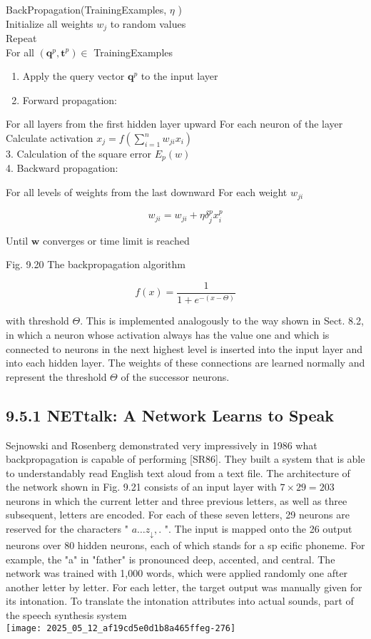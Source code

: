 \documentclass[10pt]{article}
\begin{document}
BackPropagation(TrainingExamples, $\eta$ )\\
Initialize all weights $w_{j}$ to random values\\
Repeat\\
For 
all $\left(\boldsymbol{q}^{p}, \boldsymbol{t}^{p}\right) \in$ TrainingExamples

\begin{enumerate}
  \item Apply the query vector $\boldsymbol{q}^{p}$ to the input layer
  \item Forward propagation:
\end{enumerate}

For all layers from the first hidden layer upward For each neuron of the layer Calculate activation $x_{j}=f\left(\sum_{i=1}^{n} w_{j i} x_{i}\right)$\\
3. Calculation of the square error $E_{p}(w)$\\
4. Backward propagation:

For all levels of weights from the last downward For each weight $w_{j i}$

$$
w_{j i}=w_{j i}+\eta \delta_{j}^{p} x_{i}^{p}
$$

Until $\boldsymbol{w}$ converges or time limit is reached

Fig. 9.20 The backpropagation algorithm

$$
f(x)=\frac{1}{1+e^{-(x-\Theta)}}
$$

with threshold $\Theta$. This is implemented analogously to the way shown in Sect. 8.2, in which a neuron whose activation always has the value one and which is connected to neurons in the next highest level is inserted into the input layer and into each hidden layer. The weights of these connections are learned normally and represent the threshold $\Theta$ of the successor neurons.

\subsection*{9.5.1 NETtalk: A Network Learns to Speak}
Sejnowski and Rosenberg demonstrated very impressively in 1986 what backpropagation is capable of performing [SR86]. They built a system that is able to understandably read English text aloud from a text file. The architecture of the network shown in Fig. 9.21 consists of an input layer with $7 \times 29=203$ neurons in which the current letter and three previous letters, as well as three subsequent, letters are encoded. For each of these seven letters, 29 neurons are reserved for the characters " $a \ldots z_{\downarrow},$. ". The input is mapped onto the 26 output neurons over 80 hidden neurons, each of which stands for a sp
ecific phoneme. For example, the "a" in "father" is pronounced deep, accented, and central. The network was trained with 1,000 words, which were applied randomly one after another letter by letter. For each letter, the target output was manually given for its intonation. To translate the intonation attributes into actual sounds, part of the speech synthesis system\\
\texttt{[image: 2025\_05\_12\_af19cd5e0d1b8a465ffeg-276]}
\end{document}
